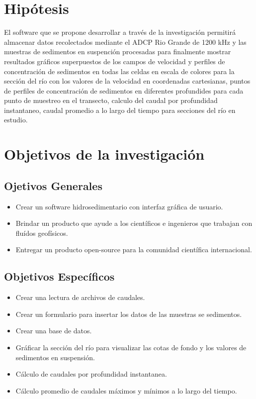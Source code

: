 \documentclass[12pt,a4paper]{report}
\begin{document}
\section{Hipótesis}
	El software que se propone desarrollar a través de la investigación permitirá almacenar datos recolectados mediante el ADCP Rio Grande de 1200 kHz y las muestras de sedimentos en suspención procesadas para finalmente mostrar resultados gráficos superpuestos de los campos de velocidad y perfiles de concentración de sedimentos en todas las celdas en escala de colores para la sección del río con los valores de la velocidad en coordenadas cartesianas, puntos de perfiles de concentración de sedimentos en diferentes profundides para cada punto de muestreo en el transecto, calculo del caudal por profundidad  instantaneo, caudal promedio a lo largo del tiempo para secciones del río en estudio.
\section{Objetivos de la investigación}
	\subsection{Ojetivos Generales}
	\begin{itemize}
	\item Crear un software hidrosedimentario con interfaz gráfica de usuario.
	\item Brindar un producto que ayude a los científicos e ingenieros que trabajan con fluídos geofísicos.
	\item Entregar un producto open-source para la comunidad científica internacional.
	\end{itemize}
	\subsection{Objetivos Específicos}
	\begin{itemize}
	\item Crear una lectura de archivos de caudales.
	\item Crear un formulario para insertar los datos de las muestras se sedimentos.
	\item Crear una base de datos.
	\item Gráficar la sección del río para visualizar las cotas de fondo y los valores de sedimentos en suspensión.
	\item Cálculo de caudales por profundidad instantanea.
	\item Cálculo promedio de caudales máximos y mínimos a lo largo del tiempo.
	\end{itemize}
\end{document}
